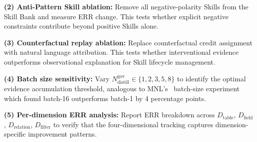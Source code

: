 \textbf{(2) Anti-Pattern Skill ablation:} Remove all negative-polarity Skills from the Skill Bank and measure ERR change. This tests whether explicit negative constraints contribute beyond positive Skills alone.

\textbf{(3) Counterfactual replay ablation:} Replace counterfactual credit assignment with natural language attribution. This tests whether interventional evidence outperforms observational explanation for Skill lifecycle management.

\textbf{(4) Batch size sensitivity:} Vary $N_{\text{distill}}^{\text{gov}} \in \{1, 2, 3, 5, 8\}$ to identify the optimal evidence accumulation threshold, analogous to MNL's~\cite{su2025mnl} batch-size experiment which found batch-16 outperforms batch-1 by 4 percentage points.

\textbf{(5) Per-dimension ERR analysis:} Report ERR breakdown across $D_{\text{table}}$, $D_{\text{field}}$, $D_{\text{relation}}$, $D_{\text{filter}}$ to verify that the four-dimensional tracking captures dimension-specific improvement patterns.
